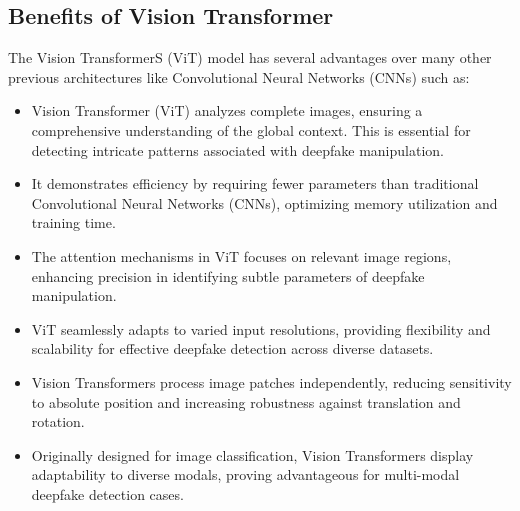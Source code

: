 \subsection{Benefits of Vision Transformer}

The Vision TransformerS (ViT) model has several advantages over many other previous architectures like Convolutional Neural Networks (CNNs) such as:

\begin{itemize}
    \item 
    Vision Transformer (ViT) analyzes complete images, ensuring a comprehensive understanding of the global context. This is essential for detecting intricate patterns associated with deepfake manipulation.
    
    \item It demonstrates efficiency by requiring fewer parameters than traditional Convolutional Neural Networks (CNNs), optimizing memory utilization and training time.
    
    \item The attention mechanisms in ViT focuses on relevant image regions, enhancing precision in identifying subtle parameters of deepfake manipulation.
    
    \item ViT seamlessly adapts to varied input resolutions, providing flexibility and scalability for effective deepfake detection across diverse datasets.
    
    \item Vision Transformers process image patches independently, reducing sensitivity to absolute position and increasing robustness against translation and rotation.
    
    \item Originally designed for image classification, Vision Transformers display adaptability to diverse modals, proving advantageous for multi-modal deepfake detection cases.
    
\end{itemize}
\newpage

  